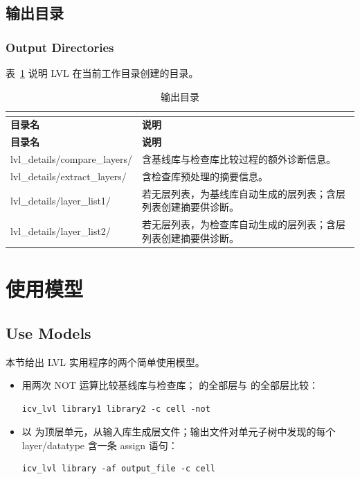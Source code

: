 \subsection{输出目录}
\subsubsection*{Output Directories}

表~\ref{tab:app-b-outdirs} 说明 LVL 在当前工作目录创建的目录。

\begin{longtable}{@{}>{\ttfamily\raggedright\arraybackslash}p{} p{}@{}}
\caption{输出目录}\\
\label{tab:app-b-outdirs}\\
\toprule
\textbf{\rmfamily 目录名} & \textbf{说明} \\
\midrule
\endfirsthead
\toprule
\textbf{\rmfamily 目录名} & \textbf{说明} \\
\midrule
\endhead
\bottomrule
\endfoot

lvl\_details/compare\_layers/ &
含基线库与检查库比较过程的额外诊断信息。 \\
\midrule

lvl\_details/extract\_layers/ &
含检查库预处理的摘要信息。 \\
\midrule

lvl\_details/layer\_list1/ &
若无层列表，为基线库自动生成的层列表；含层列表创建摘要供诊断。 \\
\midrule

lvl\_details/layer\_list2/ &
若无层列表，为检查库自动生成的层列表；含层列表创建摘要供诊断。 \\
\end{longtable}

\section{使用模型}
\subsection*{Use Models}

本节给出 LVL 实用程序的两个简单使用模型。
\begin{itemize}
  \item 用两次 NOT 运算比较基线库与检查库； 的全部层与  的全部层比较：
\begin{lstlisting}
icv_lvl library1 library2 -c cell -not
\end{lstlisting}
  \item 以  为顶层单元，从输入库生成层文件；输出文件对单元子树中发现的每个 layer/datatype 含一条 assign 语句：
\begin{lstlisting}
icv_lvl library -af output_file -c cell
\end{lstlisting}
\end{itemize}

